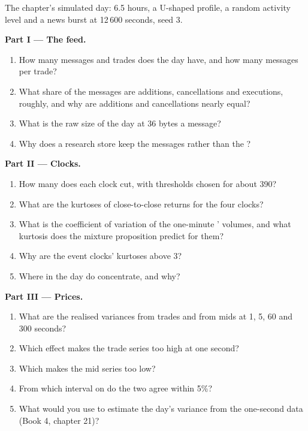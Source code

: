 \begin{problem}\label{pb:rs:market-data-for-research:1}
The chapter's simulated day: 6.5 hours, a U-shaped profile, a random activity level and a news burst at 12\,600 seconds, seed 3.

\medskip\noindent\textbf{Part I --- The feed.}
\begin{enumerate}
\item How many messages and trades does the day have, and how many messages per trade?
\item What share of the messages are additions, cancellations and executions, roughly, and why are additions and cancellations
nearly equal?
\item What is the raw size of the day at 36 bytes a message?
\item Why does a research store keep the messages rather than the ?
\end{enumerate}

\medskip\noindent\textbf{Part II --- Clocks.}
\begin{enumerate}[resume]
\item How many  does each clock cut, with thresholds chosen for about 390?
\item What are the kurtoses of close-to-close returns for the four clocks?
\item What is the coefficient of variation of the one-minute ' volumes, and what kurtosis does the mixture proposition
predict for them?
\item Why are the event clocks' kurtoses above 3?
\item Where in the day do  concentrate, and why?
\end{enumerate}

\medskip\noindent\textbf{Part III --- Prices.}
\begin{enumerate}[resume]
\item What are the realised variances from trades and from mids at 1, 5, 60 and 300 seconds?
\item Which effect makes the trade series too high at one second?
\item Which makes the mid series too low?
\item From which interval on do the two agree within 5\%?
\item What would you use to estimate the day's variance from the one-second data (Book 4, chapter 21)?
\end{enumerate}


\end{problem}
